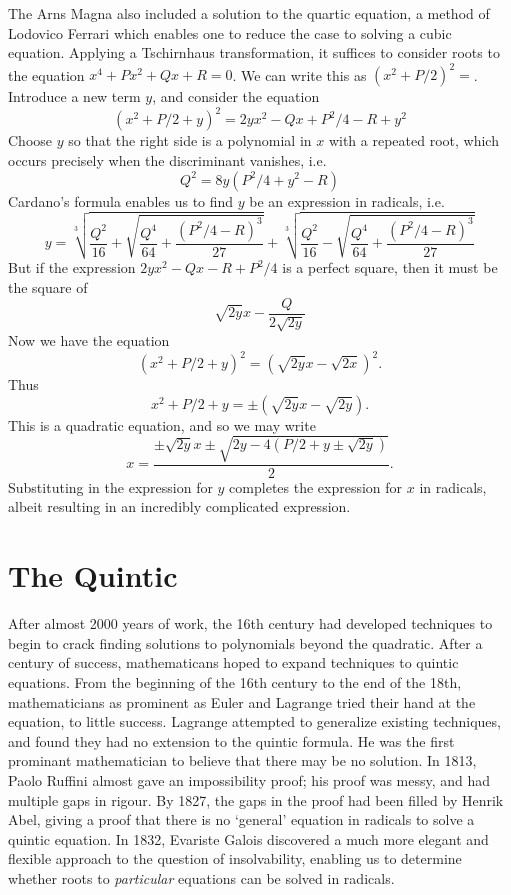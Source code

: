 The Arns Magna also included a solution to the quartic equation, a method of Lodovico Ferrari which enables one to reduce the case to solving a cubic equation. Applying a Tschirnhaus transformation, it suffices to consider roots to the equation $x^4 + Px^2 + Qx + R = 0$. We can write this as $\left( x^2 + P/2 \right)^2 = $. Introduce a new term $y$, and consider the equation
%
\[ (x^2 + P/2 + y)^2 = 2yx^2 - Qx + P^2/4 - R + y^2 \]
%
Choose $y$ so that the right side is a polynomial in $x$ with a repeated root, which occurs precisely when the discriminant vanishes, i.e.
%
\[ Q^2 = 8y(P^2/4 + y^2 - R) \]
%
Cardano's formula enables us to find $y$ be an expression in radicals, i.e.
%
\[ y = \sqrt[3]{ \frac{Q^2}{16} + \sqrt{ \frac{Q^4}{64} + \frac{(P^2/4 - R)^3}{27}}} + \sqrt[3]{ \frac{Q^2}{16} - \sqrt{ \frac{Q^4}{64} + \frac{(P^2/4 - R)^3}{27}}} \]
%
But if the expression $2yx^2 -Qx - R + P^2/4$ is a perfect square, then it must be the square of
%
\[ \sqrt{2y}x - \frac{Q}{2\sqrt{2y}} \]
%
Now we have the equation
%
\[ (x^2 + P/2 + y)^2 = \left(\sqrt{2y}x - \sqrt{2x} \right)^2. \]
%
Thus
%
\[ x^2 + P/2 + y = \pm(\sqrt{2y}x - \sqrt{2y}). \]
%
This is a quadratic equation, and so we may write
\[ x = \frac{\pm \sqrt{2y} x \pm \sqrt{2y - 4(P/2 + y \pm \sqrt{2y})}}{2}. \]
%
Substituting in the expression for $y$ completes the expression for $x$ in radicals, albeit resulting in an incredibly complicated expression.

\section{The Quintic}

After almost 2000 years of work, the 16th century had developed techniques to begin to crack finding solutions to polynomials beyond the quadratic. After a century of success, mathematicans hoped to expand techniques to quintic equations. From the beginning of the 16th century to the end of the 18th, mathematicians as prominent as Euler and Lagrange tried their hand at the equation, to little success. Lagrange attempted to generalize existing techniques, and found they had no extension to the quintic formula. He was the first prominant mathematician to believe that there may be no solution. In 1813, Paolo Ruffini almost gave an impossibility proof; his proof was messy, and had multiple gaps in rigour. By 1827, the gaps in the proof had been filled by Henrik Abel, giving a proof that there is no `general' equation in radicals to solve a quintic equation. In 1832, Evariste Galois discovered a much more elegant and flexible approach to the question of insolvability, enabling us to determine whether roots to \emph{particular} equations can be solved in radicals.


